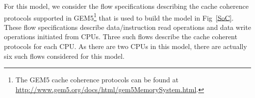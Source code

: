 \documentclass[conference]{IEEEtran}
\begin{document}



For this model, we consider the flow specifications
describing the cache coherence protocols supported in GEM5\footnote{The GEM5 cache
  coherence protocols can be found at
  \url{http://www.gem5.org/docs/html/gem5MemorySystem.html}.}
that is used to build the model in Fig~\ref{SoC}.  These
flow specifications describe data/instruction read
operations and data write operations initiated from CPUs.
Three such flows describe the cache coherent protocols for
each CPU.  As there are two CPUs in this model, there are
actually six such flows considered for this model. 

\end{document}
